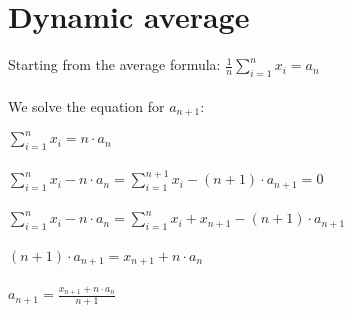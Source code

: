 %
%
%

\chapter{Dynamic average}
Starting from the average formula:
$ {\displaystyle \frac1n\sum_{i=1}^{n}x_i=a_n} $\\\\

\noindent
We solve the equation for $a_{n+1}$:

\noindent
$ {\displaystyle \sum_{i=1}^{n}x_i=n\cdot a_n} $\\\\
\noindent
$ {\displaystyle \sum_{i=1}^{n}x_i-n\cdot a_n=\sum_{i=1}^{n+1}x_i-(n+1)\cdot a_{n+1}=0} $\\\\
\noindent
$ {\displaystyle \sum_{i=1}^{n}x_i-n\cdot a_n=\sum_{i=1}^{n}x_i+x_{n+1}-(n+1)\cdot a_{n+1}} $\\\\
\noindent
$ {\displaystyle (n+1)\cdot a_{n+1}=x_{n+1}+n\cdot a_n} $\\\\
\noindent
$ {\displaystyle a_{n+1}=\frac{x_{n+1}+n\cdot a_n}{n+1}} $\\\\
